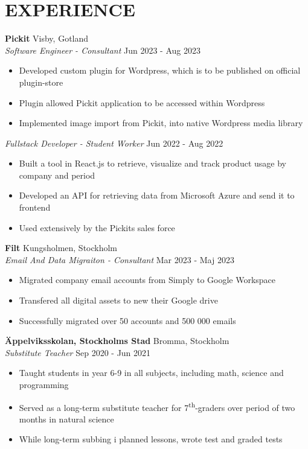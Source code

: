 \documentclass[a4paper,9pt]{extarticle}
\begin{document}
\section*{EXPERIENCE}
\noindent
\textbf{Pickit} \hfill Visby, Gotland\\ %
\textit{Software Engineer - Consultant} \hfill Jun 2023 - Aug 2023  %
\begin{itemize}
    \item Developed custom plugin for Wordpress, which is to be published on official plugin-store
    \item Plugin allowed Pickit application to be accessed within Wordpress
    \item Implemented image import from Pickit, into native Wordpress media library 
\end{itemize}
\noindent
\textit{Fullstack Developer - Student Worker} \hfill Jun 2022 - Aug 2022  %
\begin{itemize}
    \item Built a tool in React.js to retrieve, visualize and track product usage by company and period 
    \item Developed an API for retrieving data from Microsoft Azure and send it to frontend
    \item Used extensively by the Pickits sales force  
\end{itemize}

\noindent
\textbf{Filt} \hfill Kungsholmen, Stockholm\\ %
\textit{Email And Data Migraiton - Consultant} \hfill Mar 2023 - Maj 2023  %
\begin{itemize}
    \item Migrated company email accounts from Simply to Google Workspace
    \item Transfered all digital assets to new their Google drive
    \item Successfully migrated over 50 accounts and 500 000 emails 
\end{itemize}


\noindent
\textbf{Äppelviksskolan, Stockholms Stad} \hfill Bromma, Stockholm\\ %
\textit{Substitute Teacher} \hfill Sep 2020 - Jun 2021  %
\begin{itemize}
    \item Taught students in year 6-9 in all subjects, including math, science and programming
    \item Served as a long-term substitute teacher for 7\textsuperscript{th}-graders over period of two months in natural science 
    \item While long-term subbing i planned lessons, wrote test and graded tests
\end{itemize}
\end{document}
